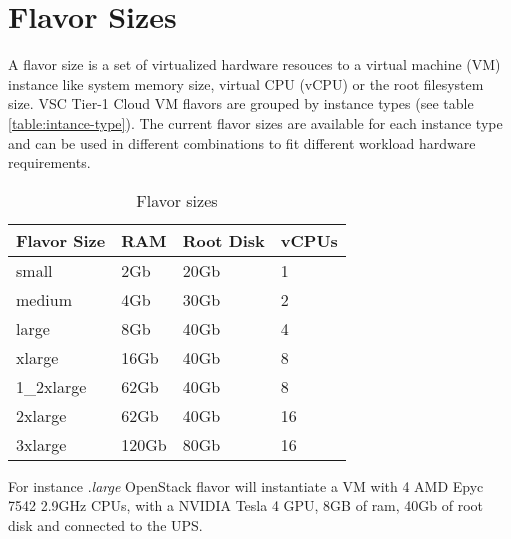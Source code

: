 \section{Flavor Sizes}\label{sec:flavor-sizes}
A flavor size is a set of virtualized hardware resouces to a virtual machine (VM) instance like system memory size, virtual CPU (vCPU) or the root filesystem size.
VSC Tier-1 Cloud VM flavors are grouped by instance types (see table \ref{table:intance-type}). The current flavor sizes are available for each instance type and can be used in different combinations to fit different workload hardware requirements.

\begin{table}[h!]
\centering
\begin{tabular}{ |p{3cm}|p{3cm}|p{3cm}|p{3cm}| }
  \hline
  \rowcolor{lightgray} \textbf{Flavor Size} & \textbf{RAM} & \textbf{Root Disk} & \textbf{vCPUs} \\
  \hline
  small & 2Gb & 20Gb & 1 \\
  \hline
  medium & 4Gb & 30Gb & 2 \\
  \hline
  large & 8Gb & 40Gb & 4 \\
  \hline
  xlarge & 16Gb & 40Gb & 8 \\
  \hline
  1\_2xlarge & 62Gb & 40Gb & 8 \\
  \hline
  2xlarge & 62Gb & 40Gb & 16 \\
  \hline
  3xlarge & 120Gb & 80Gb & 16 \\
  \hline
\end{tabular}
\caption{Flavor sizes}
\label{table:flavor-size}
\end{table}

For instance .\emph{large} OpenStack flavor will instantiate a VM with 4 AMD Epyc 7542 2.9GHz CPUs, with a NVIDIA Tesla 4 GPU, 8GB of ram, 40Gb of root disk and connected to the UPS.


